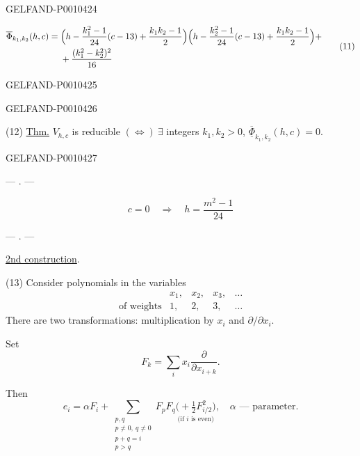 \begin{GelfandAdjacentEvidence}{GELFAND-P001042}{4}


\begin{equation*}
\begin{aligned}
\overline\Phi_{k_1,k_2}(h,c)
={}&\Bigl(h-\frac{k_1^2-1}{24}(c-13)+\frac{k_1k_2-1}{2}\Bigr)
    \Bigl(h-\frac{k_2^2-1}{24}(c-13)+\frac{k_1k_2-1}{2}\Bigr)+\\
&+\frac{(k_1^2-k_2^2)^2}{16}
\end{aligned}
\tag{11}
\end{equation*}
\end{GelfandAdjacentEvidence}
\begin{GelfandAdjacentEvidence}{GELFAND-P001042}{5}

\end{GelfandAdjacentEvidence}
\begin{GelfandAdjacentEvidence}{GELFAND-P001042}{6}


(12) \underline{Thm.} $V_{h,c}$ is reducible
$(\Leftrightarrow)\ \exists$ integers $k_1,k_2>0$,
$\underline{\overline\Phi}_{k_1,k_2}(h,c)=0$.
\end{GelfandAdjacentEvidence}
\begin{GelfandAdjacentEvidence}{GELFAND-P001042}{7}


\begin{center}— . —\end{center}
\[
c=0\quad\Rightarrow\quad h=\frac{m^2-1}{24}
\]
\begin{center}— . —\end{center}

\underline{2nd construction}.

(13) Consider polynomials in the variables
\[
\begin{array}{ccccc}
&x_1,&x_2,&x_3,&\ldots\\
\text{of weights}&1,&2,&3,&\ldots
\end{array}
\]
There are two transformations: multiplication by $x_i$ and $\partial/\partial x_i$.

Set
\begin{equation*}
F_k=\sum_i x_i\frac{\partial}{\partial x_{i+k}}.
\tag{14}
\end{equation*}

Then
\begin{equation*}
e_i=\alpha F_i+
\sum_{\substack{p,q\\p\ne0,\ q\ne0\\p+q=i\\p>q}}F_pF_q
\underset{\text{(if \(i\) is even)}}{\bigl(+\tfrac12 F_{i/2}^{2}\bigr)},
\quad\alpha\text{ — parameter.}
\tag{15}
\end{equation*}
\end{GelfandAdjacentEvidence}


